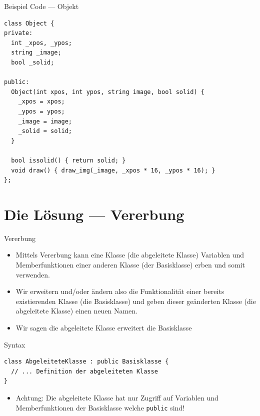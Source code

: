 \documentclass[presentation]{beamer}
\begin{document}
\begin{frame}[fragile,label={sec:org720f8b8}]{Beispiel Code --- Objekt}
 \begin{verbatim}
class Object {
private:
  int _xpos, _ypos;
  string _image;
  bool _solid;

public:
  Object(int xpos, int ypos, string image, bool solid) {
    _xpos = xpos;
    _ypos = ypos;
    _image = image;
    _solid = solid;
  }

  bool issolid() { return solid; }
  void draw() { draw_img(_image, _xpos * 16, _ypos * 16); }
};
\end{verbatim}
\end{frame}
\section{Die Lösung --- Vererbung}
\label{sec:orgc9676a6}
\begin{frame}[fragile,label={sec:orgb6dae2b}]{Vererbung}
 \begin{itemize}
\item Mittels Vererbung kann eine Klasse (die \alert{abgeleitete Klasse})
Variablen und Memberfunktionen einer anderen Klasse (der
\alert{Basisklasse}) erben und somit verwenden.
\item Wir erweitern und/oder ändern also die Funktionalität einer bereits
existierenden Klasse (die \alert{Basisklasse}) und geben dieser geänderten
Klasse (die \alert{abgeleitete Klasse}) einen neuen Namen.
\item Wir sagen \alert{die abgeleitete Klasse erweitert die Basisklasse}
\end{itemize}
\begin{block}{Syntax}
\begin{verbatim}
class AbgeleiteteKlasse : public Basisklasse {
  // ... Definition der abgeleiteten Klasse
}
\end{verbatim}
\end{block}
\begin{itemize}
\item \alert{Achtung}: Die abgeleitete Klasse hat nur Zugriff auf Variablen und
Memberfunktionen der Basisklasse welche {\color{solarizedYellow}\texttt{public} }sind!
\end{itemize}
\end{frame}
\end{document}
